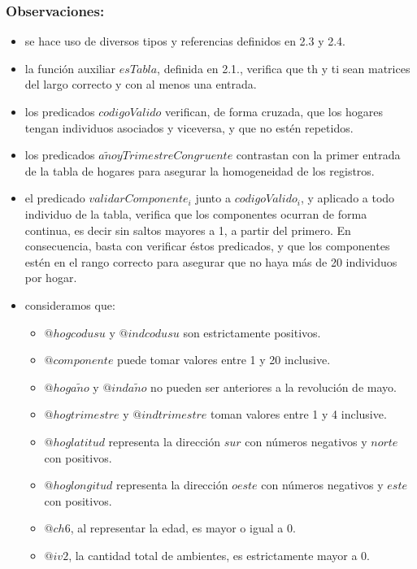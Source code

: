     \subsubsection{Observaciones:}
        \begin{itemize}
            \item se hace uso de diversos tipos y referencias definidos en 2.3 y 2.4.
            \item la funci\'on auxiliar $esTabla$, definida en 2.1., verifica que th y ti sean matrices del largo correcto y 
            con al menos una entrada.
            \item los predicados $codigoValido$ verifican, de forma cruzada, que los hogares tengan individuos asociados y viceversa, 
            y que no est\'en repetidos.    
            \item los predicados $a\tilde{n}oyTrimestreCongruente$ contrastan con la primer entrada de la tabla de hogares para asegurar
            la homogeneidad de los registros. 
            \item el predicado $validarComponente_{i}$ junto a $codigoValido_{i}$, y aplicado a todo individuo de la tabla, verifica que los 
            componentes ocurran de forma continua, es decir sin saltos mayores a 1, a partir del primero. 
            En consecuencia, basta con verificar \'estos predicados, y que los componentes est\'en en el rango correcto para asegurar 
            que no haya m\'as de 20 individuos por hogar. 
            \item consideramos que: 
                \begin{itemize}
                    \item $@hogcodusu$ y $@indcodusu$ son estrictamente positivos.
                    \item $@componente$ puede tomar valores entre 1 y 20 inclusive.
                    \item $@hoga\tilde{n}o$ y $@inda\tilde{n}o$ no pueden ser anteriores a la revoluci\'on de mayo.
                    \item $@hogtrimestre$ y $@indtrimestre$ toman valores entre 1 y 4 inclusive.
                    \item $@hoglatitud$ representa la direcci\'on $sur$ con n\'umeros negativos y $norte$ con positivos.
                    \item $@hoglongitud$ representa la direcci\'on $oeste$ con n\'umeros negativos y $este$ con positivos.
                    \item $@ch6$, al representar la edad, es mayor o igual a 0.
                    \item $@iv2$, la cantidad total de ambientes, es estrictamente mayor a 0.
                \end{itemize}
        \end{itemize}
